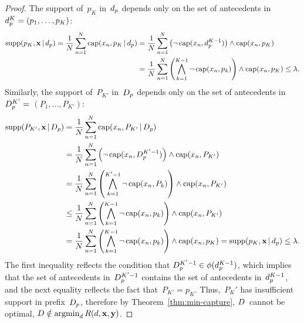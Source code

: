 \begin{arxiv}
\begin{proof}
The support of~$p_K$ in~$d_p$ depends only on the
set of antecedents in ${d_p^{K} = (p_1, \dots, p_{K})}$:
\begin{align}
\textnormal{supp}(p_K, \mathbf{x} \,|\, d_p)
= \frac{1}{N} \sum_{n=1}^N \textnormal{cap}(x_n, p_K \,|\, d_p)
&= \frac{1}{N} \sum_{n=1}^N \left( \neg\, \textnormal{cap}(x_n, d_p^{K-1}) \right)
  \wedge \textnormal{cap}(x_n, p_K) \nonumber \\
&= \frac{1}{N} \sum_{n=1}^N \left( \bigwedge_{k=1}^{K-1} \neg\, \textnormal{cap}(x_n, p_k) \right)
  \wedge \textnormal{cap}(x_n, p_K)
\le {\lambda}.
\end{align}
Similarly, the support of~$P_{K'}$ in~$D_p$ depends only on
the set of antecedents in ${D_p^{K'} =}$ ${(P_1, \dots, P_{K'})}$:
\begin{align}
\textnormal{supp}(P_{K'}, \mathbf{x} \,|\, D_p)
&= \frac{1}{N} \sum_{n=1}^N \textnormal{cap}(x_n, P_{K'} \,|\, D_p) \nonumber \\
&= \frac{1}{N} \sum_{n=1}^N \left( \neg\, \textnormal{cap}(x_n, D_p^{K'-1}) \right)
  \wedge \textnormal{cap}(x_n, P_{K'}) \nonumber \\
&= \frac{1}{N} \sum_{n=1}^N \left( \bigwedge_{k=1}^{K'-1} \neg\, \textnormal{cap}(x_n, P_k) \right)
   \wedge \textnormal{cap}(x_n, P_{K'}) \nonumber \\
&\le \frac{1}{N} \sum_{n=1}^N \left( \bigwedge_{k=1}^{K-1} \neg\, \textnormal{cap}(x_n, p_k) \right)
  \wedge \textnormal{cap}(x_n, P_{K'}) \nonumber \\
&= \frac{1}{N} \sum_{n=1}^N \left( \bigwedge_{k=1}^{K-1} \neg\, \textnormal{cap}(x_n, p_k) \right)
  \wedge \textnormal{cap}(x_n, p_{K})
= \textnormal{supp}(p_K, \mathbf{x} \,|\, d_p) \le {\lambda}.
\label{ineq:supp}
\end{align}
The first inequality reflects the condition that
${D_p^{K'-1} \in \phi(d_p^{K-1})}$,
which implies that the set of antecedents in~$D_p^{K'-1}$
contains the set of antecedents in~$d_p^{K-1}$,
and the next equality reflects the fact that~${P_{K'} = p_K}$.
%
Thus,~$P_K'$ has insufficient support in prefix~$D_p$,
therefore by Theorem~\ref{thm:min-capture}, ${D}$~cannot be optimal,
\ie ${{D} \notin \operatorname*{argmin}_{{d}} R({d}, \mathbf{x}, \mathbf{y})}$.
\end{proof}


\end{arxiv}
